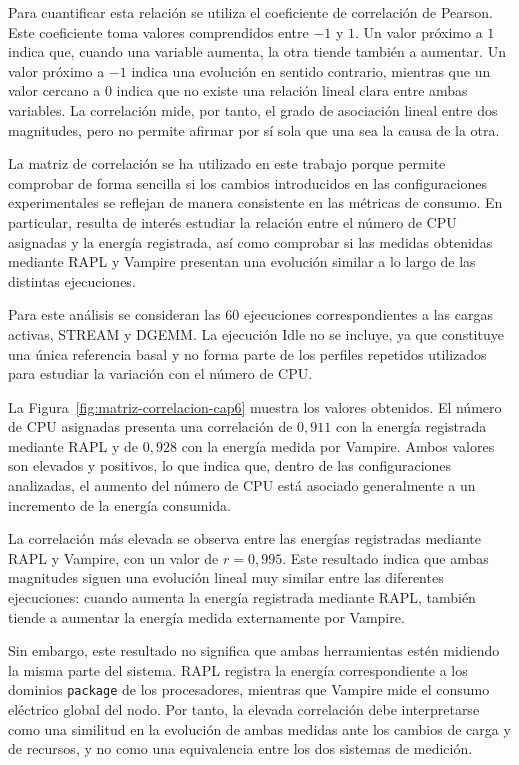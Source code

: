 Para cuantificar esta relación se utiliza el coeficiente de correlación de Pearson. Este coeficiente toma valores comprendidos entre \(-1\) y \(1\). Un valor próximo a \(1\) indica que, cuando una variable aumenta, la otra tiende también a aumentar. Un valor próximo a \(-1\) indica una evolución en sentido contrario, mientras que un valor cercano a \(0\) indica que no existe una relación lineal clara entre ambas variables. La correlación mide, por tanto, el grado de asociación lineal entre dos magnitudes, pero no permite afirmar por sí sola que una sea la causa de la otra.

La matriz de correlación se ha utilizado en este trabajo porque permite comprobar de forma sencilla si los cambios introducidos en las configuraciones experimentales se reflejan de manera consistente en las métricas de consumo. En particular, resulta de interés estudiar la relación entre el número de CPU asignadas y la energía registrada, así como comprobar si las medidas obtenidas mediante RAPL y Vampire presentan una evolución similar a lo largo de las distintas ejecuciones.

Para este análisis se consideran las 60 ejecuciones correspondientes a las cargas activas, STREAM y DGEMM. La ejecución Idle no se incluye, ya que constituye una única referencia basal y no forma parte de los perfiles repetidos utilizados para estudiar la variación con el número de CPU.

La Figura~\ref{fig:matriz-correlacion-cap6} muestra los valores obtenidos. El número de CPU asignadas presenta una correlación de \(0{,}911\) con la energía registrada mediante RAPL y de \(0{,}928\) con la energía medida por Vampire. Ambos valores son elevados y positivos, lo que indica que, dentro de las configuraciones analizadas, el aumento del número de CPU está asociado generalmente a un incremento de la energía consumida.

La correlación más elevada se observa entre las energías registradas mediante RAPL y Vampire, con un valor de \(r=0{,}995\). Este resultado indica que ambas magnitudes siguen una evolución lineal muy similar entre las diferentes ejecuciones: cuando aumenta la energía registrada mediante RAPL, también tiende a aumentar la energía medida externamente por Vampire.

Sin embargo, este resultado no significa que ambas herramientas estén midiendo la misma parte del sistema. RAPL registra la energía correspondiente a los dominios \texttt{package} de los procesadores, mientras que Vampire mide el consumo eléctrico global del nodo. Por tanto, la elevada correlación debe interpretarse como una similitud en la evolución de ambas medidas ante los cambios de carga y de recursos, y no como una equivalencia entre los dos sistemas de medición.

